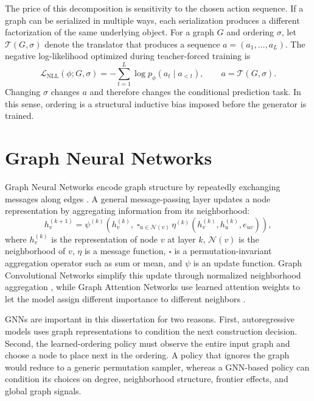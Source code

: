 The price of this decomposition is sensitivity to the chosen action sequence. If a graph can be serialized in multiple ways, each serialization produces a different factorization of the same underlying object. For a graph $G$ and ordering $\sigma$, let $\mathcal{T}(G,\sigma)$ denote the translator that produces a sequence $a=(a_1,\ldots,a_L)$. The negative log-likelihood optimized during teacher-forced training is
\begin{equation}
    \mathcal{L}_{\mathrm{NLL}}(\phi;G,\sigma)
    = -\sum_{t=1}^{L}\log p_{\phi}(a_t \mid a_{<t}),
    \qquad a=\mathcal{T}(G,\sigma).
\end{equation}
Changing $\sigma$ changes $a$ and therefore changes the conditional prediction task. In this sense, ordering is a structural inductive bias imposed before the generator is trained.

\section{Graph Neural Networks}
\label{sec:gnn-foundations}

Graph Neural Networks encode graph structure by repeatedly exchanging messages along edges \cite{scarselli2009gnn,gilmer2017mpnn}. A general message-passing layer updates a node representation by aggregating information from its neighborhood:
\begin{equation}
    h_v^{(k+1)} = \psi^{(k)}\left(h_v^{(k)},\; \square_{u\in\mathcal{N}(v)}\, \eta^{(k)}(h_v^{(k)},h_u^{(k)},e_{uv})\right),
\end{equation}
where $h_v^{(k)}$ is the representation of node $v$ at layer $k$, $\mathcal{N}(v)$ is the neighborhood of $v$, $\eta$ is a message function, $\square$ is a permutation-invariant aggregation operator such as sum or mean, and $\psi$ is an update function. Graph Convolutional Networks simplify this update through normalized neighborhood aggregation \cite{kipf2017gcn}, while Graph Attention Networks use learned attention weights to let the model assign different importance to different neighbors \cite{velickovic2018gat}.

GNNs are important in this dissertation for two reasons. First, autoregressive models uses graph representations to condition the next construction decision. Second, the learned-ordering policy must observe the entire input graph and choose a node to place next in the ordering. A policy that ignores the graph would reduce to a generic permutation sampler, whereas a GNN-based policy can condition its choices on degree, neighborhood structure, frontier effects, and global graph signals.

